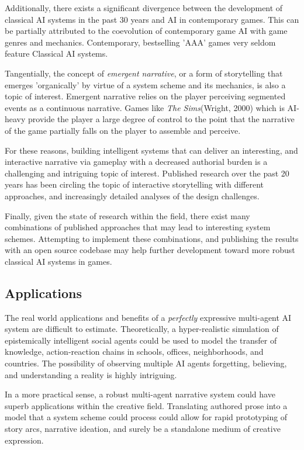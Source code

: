\documentclass[letterpaper, 10 pt, conference]{ieeeconf}  %
\begin{document}
Additionally, there exists a significant divergence between the development of classical AI systems in the past 30 years and AI in contemporary games. This can be partially attributed to the coevolution of contemporary game AI with game genres and mechanics. Contemporary, bestselling 'AAA' games very seldom feature Classical AI systems.

Tangentially, the concept of \emph{emergent narrative}, or a form of storytelling that emerges 'organically' by virtue of a system scheme and its mechanics, is also a topic of interest. Emergent narrative relies on the player perceiving segmented events as a continuous narrative. Games like \emph{The Sims}(Wright, 2000) which is AI-heavy provide the player a large degree of control to the point that the narrative of the game partially falls on the player to assemble and perceive.

For these reasons, building intelligent systems that can deliver an interesting, and interactive narrative via gameplay with a decreased authorial burden is a challenging and intriguing topic of interest. Published research over the past 20 years has been circling the topic of interactive storytelling with different approaches, and increasingly detailed analyses of the design challenges.

Finally, given the state of research within the field, there exist many combinations of published approaches that may lead to interesting system schemes. Attempting to implement these combinations, and publishing the results with an open source codebase may help further development toward more robust classical AI systems in games.
\subsection{Applications}
The real world applications and benefits of a \emph{perfectly} expressive multi-agent AI system are difficult to estimate. Theoretically, a hyper-realistic simulation of epistemically intelligent social agents could be used to model the transfer of knowledge, action-reaction chains in schools, offices, neighborhoods, and countries. The possibility of observing multiple AI agents forgetting, believing, and understanding a reality is highly intriguing.

In a more practical sense, a robust multi-agent narrative system could have superb applications within the creative field. Translating authored prose into a model that a system scheme could process could allow for rapid prototyping of story arcs, narrative ideation, and surely be a standalone medium of creative expression.
\end{document}
